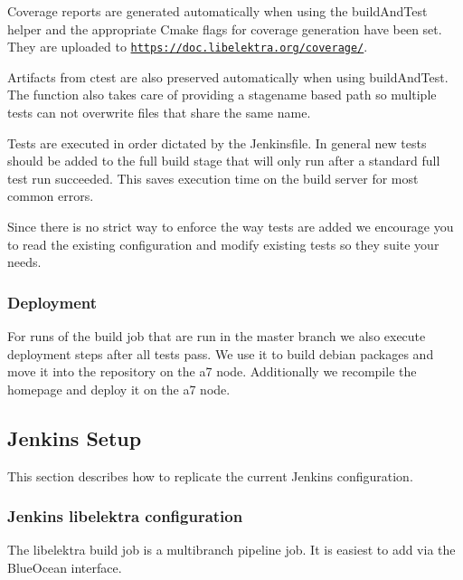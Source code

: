 Coverage reports are generated automatically when using the build\+And\+Test helper and the appropriate Cmake flags for coverage generation have been set. They are uploaded to \href{https://doc.libelektra.org/coverage/}{\tt https\+://doc.\+libelektra.\+org/coverage/}.

Artifacts from {\ttfamily ctest} are also preserved automatically when using build\+And\+Test. The function also takes care of providing a stagename based path so multiple tests can not overwrite files that share the same name.

Tests are executed in order dictated by the Jenkinsfile. In general new tests should be added to the \textquotesingle{}full build stage\textquotesingle{} that will only run after a standard full test run succeeded. This saves execution time on the build server for most common errors.

Since there is no strict way to enforce the way tests are added we encourage you to read the existing configuration and modify existing tests so they suite your needs.

\subsubsection*{Deployment}

For runs of the build job that are run in the master branch we also execute deployment steps after all tests pass. We use it to build debian packages and move it into the repository on the a7 node. Additionally we recompile the homepage and deploy it on the a7 node.

\subsection*{Jenkins Setup}

This section describes how to replicate the current Jenkins configuration.

\subsubsection*{Jenkins libelektra configuration}

The {\ttfamily libelektra} build job is a multibranch pipeline job. It is easiest to add via the Blue\+Ocean interface.

